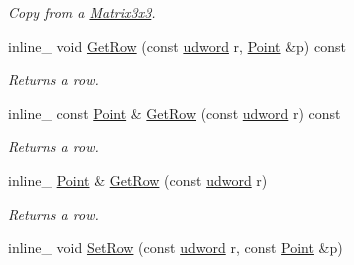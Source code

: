 \begin{DoxyCompactItemize}
\begin{DoxyCompactList}\small\item\em Copy from a \hyperlink{classOpcode_1_1Matrix3x3}{Matrix3x3}. \end{DoxyCompactList}\item 
inline\+\_\+ void \hyperlink{classOpcode_1_1Matrix3x3_a045ec767b5db56a4dca479a81932c1dd}{Get\+Row} (const \hyperlink{IceTypes_8h_a44c6f1920ba5551225fb534f9d1a1733}{udword} r, \hyperlink{classOpcode_1_1Point}{Point} \&p) const \hypertarget{classOpcode_1_1Matrix3x3_a045ec767b5db56a4dca479a81932c1dd}{}\label{classOpcode_1_1Matrix3x3_a045ec767b5db56a4dca479a81932c1dd}

\begin{DoxyCompactList}\small\item\em Returns a row. \end{DoxyCompactList}\item 
inline\+\_\+ const \hyperlink{classOpcode_1_1Point}{Point} \& \hyperlink{classOpcode_1_1Matrix3x3_a582699f5cc75265e1889ec9781967606}{Get\+Row} (const \hyperlink{IceTypes_8h_a44c6f1920ba5551225fb534f9d1a1733}{udword} r) const \hypertarget{classOpcode_1_1Matrix3x3_a582699f5cc75265e1889ec9781967606}{}\label{classOpcode_1_1Matrix3x3_a582699f5cc75265e1889ec9781967606}

\begin{DoxyCompactList}\small\item\em Returns a row. \end{DoxyCompactList}\item 
inline\+\_\+ \hyperlink{classOpcode_1_1Point}{Point} \& \hyperlink{classOpcode_1_1Matrix3x3_a7562cdb1ec688846a1b5a5f3364077e6}{Get\+Row} (const \hyperlink{IceTypes_8h_a44c6f1920ba5551225fb534f9d1a1733}{udword} r)\hypertarget{classOpcode_1_1Matrix3x3_a7562cdb1ec688846a1b5a5f3364077e6}{}\label{classOpcode_1_1Matrix3x3_a7562cdb1ec688846a1b5a5f3364077e6}

\begin{DoxyCompactList}\small\item\em Returns a row. \end{DoxyCompactList}\item 
inline\+\_\+ void \hyperlink{classOpcode_1_1Matrix3x3_aba1662233e03ad57d035278260b4a07c}{Set\+Row} (const \hyperlink{IceTypes_8h_a44c6f1920ba5551225fb534f9d1a1733}{udword} r, const \hyperlink{classOpcode_1_1Point}{Point} \&p)\hypertarget{classOpcode_1_1Matrix3x3_aba1662233e03ad57d035278260b4a07c}{}\label{classOpcode_1_1Matrix3x3_aba1662233e03ad57d035278260b4a07c}


\end{DoxyCompactItemize}
